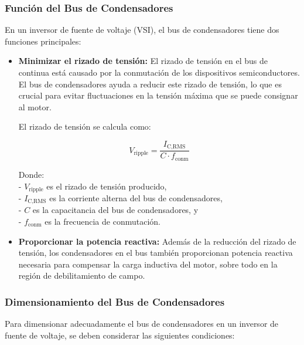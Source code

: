 \subsubsection{Función del Bus de Condensadores}

En un inversor de fuente de voltaje (VSI), el bus de condensadores tiene dos funciones principales:

\begin{itemize}
	\item \textbf{Minimizar el rizado de tensión:} El rizado de tensión en el bus de continua está causado por la conmutación de los dispositivos semiconductores. El bus de condensadores ayuda a reducir este rizado de tensión, lo que es crucial para evitar fluctuaciones en la tensión máxima que se puede consignar al motor.
	
	El rizado de tensión se calcula como:
	
	\[
	V_{\text{ripple}} = \frac{I_{\text{C,RMS}}}{C \cdot f_{\text{conm}}}
	\]
	
	Donde:\\
	- \( V_{\text{ripple}} \) es el rizado de tensión producido,\\
	- \( I_{\text{C,RMS}} \) es la corriente alterna del bus de condensadores,\\
	- \( C \) es la capacitancia del bus de condensadores, y\\
	- \( f_{\text{conm}} \) es la frecuencia de conmutación.\\
	
	\item \textbf{Proporcionar la potencia reactiva:} Además de la reducción del rizado de tensión, los condensadores en el bus también proporcionan potencia reactiva necesaria para compensar la carga inductiva del motor, sobre todo en la región de debilitamiento de campo.
	
\end{itemize}

\subsubsection{Dimensionamiento del Bus de Condensadores}

Para dimensionar adecuadamente el bus de condensadores en un inversor de fuente de voltaje, se deben considerar las siguientes condiciones:

